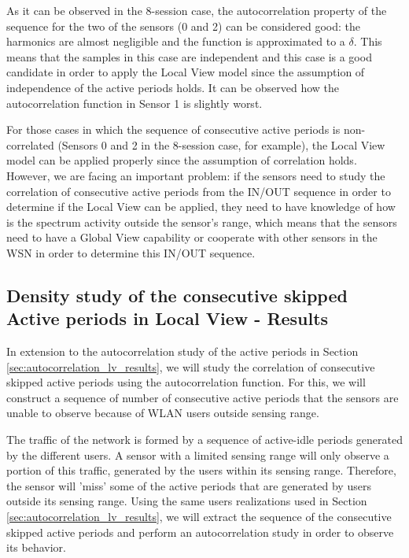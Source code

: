 As it can be observed in the 8-session case, the autocorrelation property of the sequence for the two of the sensors (0 and 2) can be considered good: the harmonics are almost negligible and the function is approximated to a $\delta$. This means that the samples in this case are independent and this case is a good candidate in order to apply the Local View model since the assumption of independence of the active periods holds. It can be observed how the autocorrelation function in Sensor 1 is slightly worst.

For those cases in which the sequence of consecutive active periods is non-correlated (Sensors 0 and 2 in the 8-session case, for example), the Local View model can be applied properly since the assumption of correlation holds. However, we are facing an important problem: if the sensors need to study the correlation of consecutive active periods from the IN/OUT sequence in order to determine if the Local View can be applied, they need to have knowledge of how is the spectrum activity outside the sensor's range, which means that the sensors need to have a Global View capability or cooperate with other sensors in the \acs{WSN} in order to determine this IN/OUT sequence.

\subsection{Density study of the consecutive skipped Active periods in Local View - Results} \label{sec:autocorrelation_lv_skipped_results}
In extension to the autocorrelation study of the active periods in Section \ref{sec:autocorrelation_lv_results}, we will study the correlation of consecutive skipped active periods using the autocorrelation function. For this, we will construct a sequence of number of consecutive active periods that the sensors are unable to observe because of \acs{WLAN} users outside sensing range.

The traffic of the network is formed by a sequence of active-idle periods generated by the different users. A sensor with a limited sensing range will only observe a portion of this traffic, generated by the users within its sensing range. Therefore, the sensor will 'miss' some of the active periods that are generated by users outside its sensing range. Using the same users realizations used in Section \ref{sec:autocorrelation_lv_results}, we will extract the sequence of the consecutive skipped active periods and perform an autocorrelation study in order to observe its behavior.

